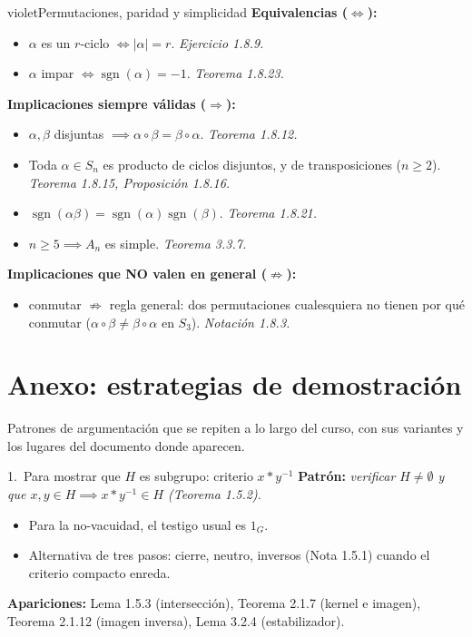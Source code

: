 \documentclass[11pt,twoside]{article}
\DeclareMathOperator{\sgn}{sgn}
\begin{document}
\begin{equivbox}{violet}{Permutaciones, paridad y simplicidad}
\textbf{Equivalencias ($\Leftrightarrow$):}
\begin{itemize}[leftmargin=1.8em]
\item $\alpha$ es un $r$-ciclo $\iff \lvert \alpha \rvert = r$. \hfill\textit{Ejercicio 1.8.9.}
\item $\alpha$ impar $\iff \sgn(\alpha) = -1$. \hfill\textit{Teorema 1.8.23.}
\end{itemize}
\textbf{Implicaciones siempre válidas ($\Rightarrow$):}
\begin{itemize}[leftmargin=1.8em]
\item $\alpha, \beta$ disjuntas $\implies \alpha \circ \beta = \beta \circ \alpha$. \hfill\textit{Teorema 1.8.12.}
\item Toda $\alpha \in S_{n}$ es producto de ciclos disjuntos, y de transposiciones ($n \geq 2$). \hfill\textit{Teorema 1.8.15, Proposición 1.8.16.}
\item $\sgn(\alpha\beta) = \sgn(\alpha)\sgn(\beta)$. \hfill\textit{Teorema 1.8.21.}
\item $n \geq 5 \implies A_{n}$ es simple. \hfill\textit{Teorema 3.3.7.}
\end{itemize}
\textbf{Implicaciones que NO valen en general ($\not\Rightarrow$):}
\begin{itemize}[leftmargin=1.8em]
\item conmutar $\not\Rightarrow$ regla general: dos permutaciones cualesquiera no tienen por qué conmutar ($\alpha \circ \beta \neq \beta \circ \alpha$ en $S_{3}$). \hfill\textit{Notación 1.8.3.}
\end{itemize}
\end{equivbox}

\section{Anexo: estrategias de demostración}

Patrones de argumentación que se repiten a lo largo del curso, con sus variantes y los lugares del documento donde aparecen.

\begin{strategybox}{1.\ Para mostrar que $H$ es subgrupo: criterio $x \ast y^{-1}$}
\textbf{Patrón:} \textit{verificar $H \neq \emptyset$ y que $x, y \in H \implies x \ast y^{-1} \in H$ (Teorema 1.5.2).}
\begin{itemize}[leftmargin=1.5em]
\item Para la no-vacuidad, el testigo usual es $1_{G}$.
\item Alternativa de tres pasos: cierre, neutro, inversos (Nota 1.5.1) cuando el criterio compacto enreda.
\end{itemize}
\textbf{Apariciones:} Lema 1.5.3 (intersección), Teorema 2.1.7 (kernel e imagen), Teorema 2.1.12 (imagen inversa), Lema 3.2.4 (estabilizador).
\end{strategybox}
\end{document}
